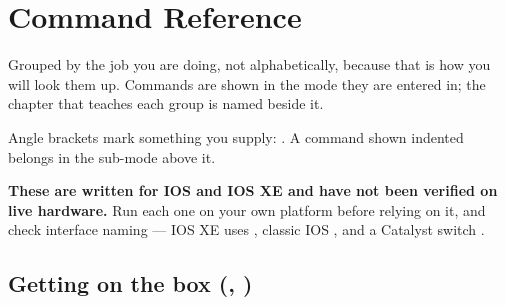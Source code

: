 \chapter{Command Reference}\label{app:commands}

Grouped by the job you are doing, not alphabetically, because that is how you
will look them up. Commands are shown in the mode they are entered in; the
chapter that teaches each group is named beside it.

\begin{alertbox}
Angle brackets mark something you supply: . A command shown
indented belongs in the sub-mode above it.

\textbf{These are written for IOS and IOS XE and have not been verified on live
hardware.} Run each one on your own platform before relying on it, and check
interface naming --- IOS XE uses , classic IOS
, and a Catalyst switch .
\end{alertbox}

\section{Getting on the box \textnormal{(, )}}

